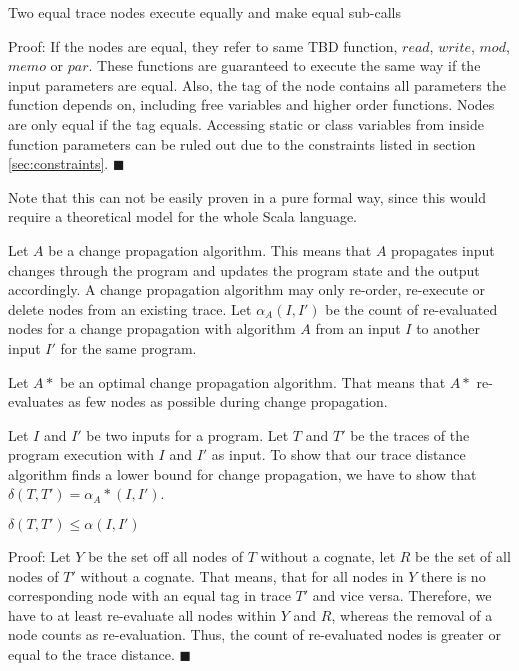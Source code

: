 \begin{lemma}
\label{lem:equalExec}
Two equal trace nodes execute equally and make equal sub-calls
\end{lemma}

Proof: If the nodes are equal, they refer to same TBD function, $read$, $write$, $mod$, $memo$ or $par$. These functions are guaranteed to execute the same way if the input parameters are equal. Also, the tag of the node contains all parameters the function depends on, including free variables and higher order functions. Nodes are only equal if the tag equals. Accessing static or class variables from inside function parameters can be ruled out due to the constraints listed in section \ref{sec:constraints}. $\blacksquare$

Note that this can not be easily proven in a pure formal way, since this would require a theoretical model for the whole Scala language. 

\begin{definition}
Let $A$ be a change propagation algorithm. This means that $A$ propagates input changes through the program and updates the program state and the output accordingly. A change propagation algorithm may only re-order, re-execute or delete nodes from an existing trace. 
Let $\alpha_A(I, I')$ be the count of re-evaluated nodes for a change propagation with algorithm $A$ from an input $I$ to another input $I'$ for the same program. 
\end{definition}

\begin{definition}
Let $A*$ be an optimal change propagation algorithm. That means that $A*$ re-evaluates as few nodes as possible during change propagation. 
\end{definition}

Let $I$ and $I'$ be two inputs for a program. Let $T$ and $T'$ be the traces of the program execution with $I$ and $I'$ as input. 
To show that our trace distance algorithm finds a lower bound for change propagation, we have to show that $\delta(T, T') = \alpha_A*(I, I')$. 

\begin{lemma}
\label{lem:alphaLeq}
$\delta(T, T') \leq \alpha(I, I')$
\end{lemma} 
Proof: Let $Y$ be the set off all nodes of $T$ without a cognate, let $R$ be the set of all nodes of $T'$ without a cognate. 
That means, that for all nodes in $Y$ there is no corresponding node with an equal tag in trace $T'$ and vice versa. Therefore, we have to at least re-evaluate all nodes within $Y$ and $R$, whereas the removal of a node counts as re-evaluation. Thus, the count of re-evaluated nodes is greater or equal to the trace distance. $\blacksquare$

